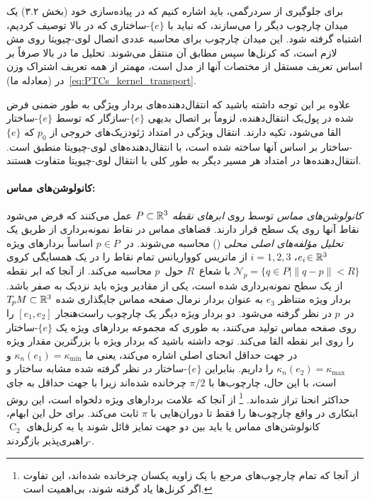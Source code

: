 برای جلوگیری از سردرگمی، باید اشاره کنیم که \citet{schonsheck2018parallel} در پیاده‌سازی خود (بخش ۳.۲) یک میدان چارچوب دیگر را می‌سازند، که نباید با $\{e\}$-ساختاری که در بالا توصیف کردیم، اشتباه گرفته شود.
این میدان چارچوب برای محاسبه عددی اتصال لوی-چیویتا روی مش لازم است، که کرنل‌ها سپس مطابق آن منتقل می‌شوند.
تحلیل ما در بالا صرفاً بر اساس تعریف مستقل از مختصات آنها از مدل است، مهمتر از همه تعریف اشتراک وزن در (معادله ما)~\eqref{eq:PTCs_kernel_transport}.

علاوه بر این توجه داشته باشید که انتقال‌دهنده‌های بردار ویژگی به طور ضمنی فرض شده در پول‌بک انتقال‌دهنده، لزوماً بر اتصال بدیهی $\{e\}$-سازگار که توسط $\{e\}$-ساختار القا می‌شود، تکیه دارند.
انتقال ویژگی در امتداد ژئودزیک‌های خروجی از $p_0$ که $\{e\}$-ساختار بر اساس آنها ساخته شده است، با انتقال‌دهنده‌های لوی-چیویتا منطبق است.
انتقال‌دهنده‌ها در امتداد هر مسیر دیگر به طور کلی با انتقال لوی-چیویتا متفاوت هستند.





\paragraph{کانولوشن‌های مماس:}
\emph{کانولوشن‌های مماس} توسط \citet{tatarchenko2018tangent} روی \emph{ابرهای نقطه} ${P\subset \mathbb{R}^3}$ عمل می‌کنند که فرض می‌شود نقاط آنها روی یک سطح قرار دارند.
فضاهای مماس در نقاط نمونه‌برداری از طریق یک \emph{تحلیل مؤلفه‌های اصلی محلی} () محاسبه می‌شوند.
 در~$p\in P$ اساساً بردارهای ویژه ${e_i \!\in \mathbb{R}^3}$، ${i=\!1,2,3}$ از ماتریس کوواریانس تمام نقاط را در یک همسایگی کروی ${\mathcal{N}_p =} {\{q\in P | \lVert q-p\rVert<R \}}$ با شعاع~$R$ حول~$p$ محاسبه می‌کند.
از آنجا که ابر نقطه از یک سطح نمونه‌برداری شده است، یکی از مقادیر ویژه باید نزدیک به صفر باشد.
بردار ویژه متناظر $e_3$ به عنوان بردار نرمال صفحه مماس جایگذاری شده $T_{\mkern-1.5mu p}\mkern-.5muM \subset \mathbb{R}^3$ در~$p$ در نظر گرفته می‌شود.
دو بردار ویژه دیگر یک چارچوب راست‌هنجار $[e_1,e_2]$ را روی صفحه مماس تولید می‌کنند، به طوری که مجموعه بردارهای ویژه  یک $\{e\}$-ساختار را روی ابر نقطه القا می‌کند.
توجه داشته باشید که بردار ویژه با بزرگترین مقدار ویژه در جهت حداقل انحنای اصلی اشاره می‌کند، یعنی ما $\kappa_n(e_1) = \kappa_{\min}$ و $\kappa_n(e_2) = \kappa_{\max}$ را داریم.
بنابراین $\{e\}$-ساختار در نظر گرفته شده مشابه ساختار \citet{boscaini2015learning} و \citet{monti2017geometric} است، با این حال، چارچوب‌ها با $\pi/2$ چرخانده شده‌اند زیرا با جهت حداقل به جای حداکثر انحنا تراز شده‌اند.%
\footnote{
    از آنجا که تمام چارچوب‌های مرجع با یک زاویه یکسان چرخانده شده‌اند، این تفاوت اگر کرنل‌ها یاد گرفته شوند، بی‌اهمیت است.
}
از آنجا که علامت بردارهای ویژه دلخواه است، این روش ابتکاری در واقع چارچوب‌ها را فقط تا دوران‌هایی با $\pi$ ثابت می‌کند.
برای حل این ابهام، کانولوشن‌های مماس یا باید بین دو جهت تمایز قائل شوند یا به کرنل‌های $\operatorname{C}_2$-راهبری‌پذیر بازگردند.

